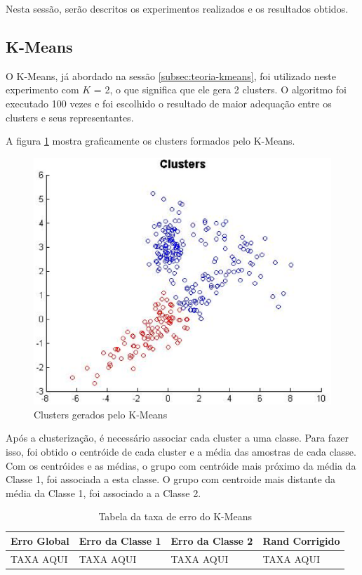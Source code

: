 
Nesta sessão, serão descritos os experimentos realizados e os resultados obtidos.

\subsection{K-Means}
\label{subsec:exp-kmeans}

O K-Means, já abordado na sessão \ref{subsec:teoria-kmeans}, foi utilizado neste experimento com $K$ = 2, o que significa que ele gera 2 clusters. O algoritmo foi executado 100 vezes e foi escolhido o resultado de maior adequação entre os clusters e seus representantes.

A figura \ref{fig:clusters} mostra graficamente os clusters formados pelo K-Means.

\begin{figure}[H]
\center
\includegraphics[scale=0.60]{imagens/tecnicas/clusters.eps}
\caption{Clusters gerados pelo K-Means}
\label{fig:clusters}
\end{figure}

Após a clusterização, é necessário associar cada cluster a uma classe. Para fazer isso, foi obtido o centróide de cada cluster e a média das amostras de cada classe. Com os centróides e as médias, o grupo com centróide mais próximo da média da Classe 1, foi associada a esta classe. O grupo com centroide mais distante da média da Classe 1, foi associado a a Classe 2.


\begin{table}[H]
\begin{center}
\begin{tabular}{|l|l|l|l|}
\hline
Erro Global	&	Erro da Classe 1	&	Erro da Classe 2	&	Rand Corrigido	\\
\hline %
TAXA AQUI	&		TAXA AQUI		&		TAXA AQUI		&	TAXA AQUI		\\
\hline
\end{tabular}%
\end{center}   %
\caption{Tabela da taxa de erro do K-Means}
\label{tab:erro-kmeans}
\end{table}

